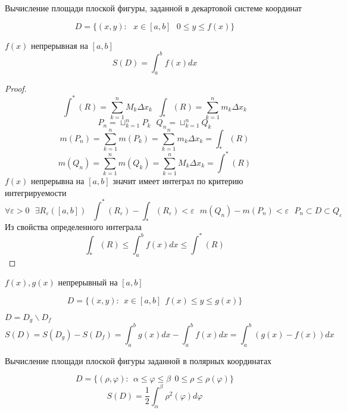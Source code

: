 \begin{title}[\Large]
  Вычисление площади плоской фигуры, заданной в декартовой системе координат
\end{title}

\begin{defin}
 $$
  D = \{ (x,y): ~~~ x \in [a,b]  ~~~ 0 \le y \le f(x) \}
 $$
\end{defin}

\begin{theorem}
  $f(x)$ непрерывная на $[a,b]$
  $$
  S(D) = \int_a^b f(x) dx
  $$
\end{theorem}

\begin{proof}
  $$
  \int^* (R) = \sum_{k=1}^n M_k \Delta x_k ~~~
  \int_* (R) = \sum_{k=1}^n m_k \Delta x_k
  $$
  $$
  P_n = \sqcup_{k=1}^n P_k ~~~
  Q_n = \sqcup_{k=1}^n Q_k
  $$
  $$
  m(P_n) = \sum_{k=1}^n m(P_k) = \sum_{k=1}^n m_k \Delta x_k = \int_* (R)
  $$
  $$
  m(Q_n) = \sum_{k=1}^n m(Q_k) = \sum_{k=1}^n M_k \Delta x_k = \int^* (R)
  $$
  $f(x)$ непрерывна на $[a,b]$ значит имеет интеграл по критерию интегрируемости
  $$
  \forall \varepsilon > 0 ~~~
  \exists R_{\varepsilon} ([a,b]) ~~~
  \int^*(R_{\varepsilon}) - \int_* (R_{\varepsilon}) < \varepsilon ~~~
  m(Q_n) - m(P_n) < \varepsilon ~~~
  P_n \subset D \subset Q_{\varepsilon}
  $$
  Из свойства определенного интеграла
  $$
  \int_* (R) \le \int_a^b f(x)dx \le \int^* (R)
  $$
\end{proof}

\begin{theorem}
  $f(x),g(x)$ непрерывный на $[a,b]$

  $$
  D = \{ (x,y): ~~ x \in [a,b] ~~ f(x) \le y \le g(x) \}
  $$

  $D = D_g \backslash D_f$
  $$
  S(D) = S(D_g) - S(D_f) = \int_a^b g(x)dx - \int_a^b f(x)dx =
  \int_a^b (g(x) - f(x)) dx
  $$
\end{theorem}

\begin{title}[\Large]
  Вычисление площади плоской фигуры заданной в полярных координатах
\end{title}

\begin{theorem}
  $$
  D = \{ (\rho,\varphi): ~~ \alpha \le \varphi \le \beta ~~ 0 \le
  \rho \le \rho(\varphi) \}
  $$
  $$
  S(D) = \frac{1}{2} \int_{\alpha}^{\beta} \rho^2(\varphi) d\varphi
  $$
\end{theorem}

